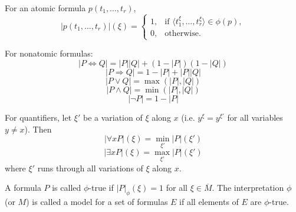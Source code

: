 For an atomic formula $p(t_1, \ldots, t_r)$,
$$|p(t_1, \ldots, t_r)|(\xi) = \begin{cases} 1, & \text{if } \langle t_1^\xi, \ldots, t_r^\xi \rangle \in \phi(p), \\ 0, & \text{otherwise}. \end{cases}$$

For nonatomic formulas:
$$|P \Leftrightarrow Q| = |P||Q| + (1 - |P|)(1 - |Q|)$$
$$|P \Rightarrow Q| = 1 - |P| + |P||Q|$$
$$|P \vee Q| = \max(|P|, |Q|)$$
$$|P \wedge Q| = \min(|P|, |Q|)$$
$$|\neg P| = 1 - |P|$$

For quantifiers, let $\xi'$ be a variation of $\xi$ along $x$ (i.e. $y^\xi = y^{\xi'}$ for all variables $y \neq x$). Then
$$|\forall x P|(\xi) = \min_{\xi'} |P|(\xi')$$
$$|\exists x P|(\xi) = \max_{\xi'} |P|(\xi')$$
where $\xi'$ runs through all variations of $\xi$ along $x$.

A formula $P$ is called $\phi$-true if $|P|_\phi(\xi) = 1$ for all $\xi \in \overline{M}$. The interpretation $\phi$ (or $M$) is called a model for a set of formulas $E$ if all elements of $E$ are $\phi$-true.
